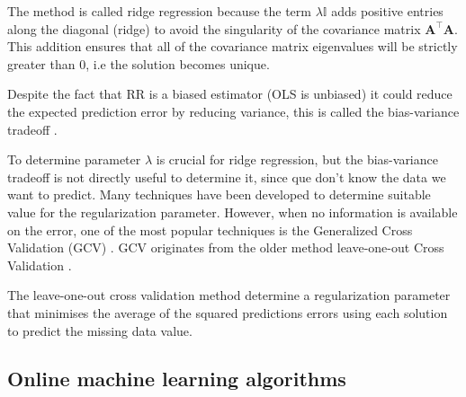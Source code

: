 The method is called ridge regression because the term $\lambda \mathbb{I}$ adds positive entries along the diagonal (ridge) to avoid the
singularity of the covariance matrix $\mathbf{A}^\top \mathbf{A}$. This addition ensures that all of the covariance matrix eigenvalues will be strictly greater than 0, i.e the solution becomes unique.

Despite the fact that RR is a biased estimator (OLS is unbiased) it could
reduce the expected prediction error by reducing variance, this is called the bias-variance tradeoff  \cite{hoerl1970}. 

To determine parameter $\lambda$ is crucial for ridge regression, but the bias-variance tradeoff is not directly useful to determine it, since que don't know the data we want to predict. Many techniques have been developed to determine suitable value for the regularization parameter. However, when no information is available on the error, one of the most popular techniques is the Generalized Cross Validation (GCV) \cite{bauer2011}. 
GCV originates from the older method leave-one-out Cross Validation \cite{stone1974}.

The leave-one-out cross validation method determine a regularization parameter that minimises the average of the squared predictions errors using each solution to predict the missing data value.




\subsection{Online machine learning algorithms}

